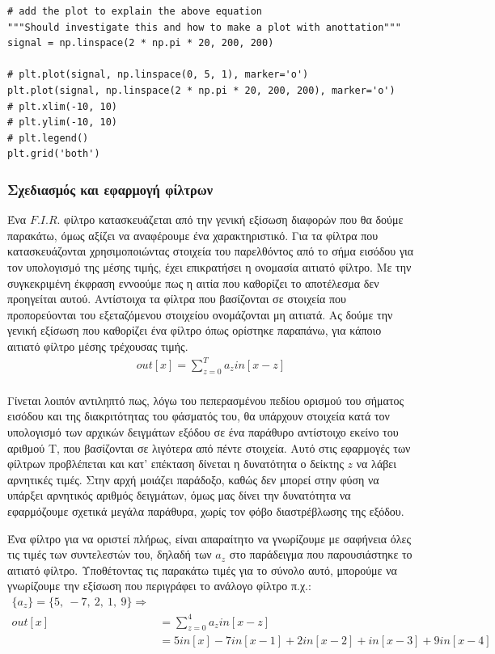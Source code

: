 \documentclass[breaklines=true, 12pt]{article}
\begin{document}
\begin{verbatim}
# add the plot to explain the above equation
"""Should investigate this and how to make a plot with anottation"""
signal = np.linspace(2 * np.pi * 20, 200, 200)

# plt.plot(signal, np.linspace(0, 5, 1), marker='o')
plt.plot(signal, np.linspace(2 * np.pi * 20, 200, 200), marker='o')
# plt.xlim(-10, 10)
# plt.ylim(-10, 10)
# plt.legend()
plt.grid('both')
\end{verbatim}
\subsubsection{Σχεδιασμός και εφαρμογή φίλτρων}
\label{sec:org9ff996f}
Ένα \(F.I.R.\) φίλτρο κατασκευάζεται από την γενική εξίσωση διαφορών που θα δούμε παρακάτω,
όμως αξίζει να αναφέρουμε ένα χαρακτηριστικό. Για τα φίλτρα που κατασκευάζονται
χρησιμοποιώντας στοιχεία του παρελθόντος από το σήμα εισόδου για τον υπολογισμό της μέσης τιμής,
έχει επικρατήσει η ονομασία αιτιατό φίλτρο. Με την συγκεκριμένη έκφραση εννοούμε πως
η αιτία που καθορίζει το αποτέλεσμα δεν προηγείται αυτού. Αντίστοιχα τα φίλτρα που
βασίζονται σε στοιχεία που προπορεύονται του εξεταζόμενου στοιχείου ονομάζονται μη
αιτιατά. Ας δούμε την γενική εξίσωση που καθορίζει ένα φίλτρο όπως ορίστηκε παραπάνω,
για κάποιο αιτιατό φίλτρο μέσης τρέχουσας τιμής.
\begin{equation}
\begin{align}
out[x] = \sum_{z=0}^{{T}} a_{z} in[x-z] \\
\end{align}
\end{equation}

Γίνεται λοιπόν αντιληπτό πως, λόγω του πεπερασμένου πεδίου ορισμού του σήματος εισόδου
και της διακριτότητας του φάσματός του, θα υπάρχουν στοιχεία κατά τον υπολογισμό των
αρχικών δειγμάτων εξόδου σε ένα παράθυρο αντίστοιχο εκείνο του αριθμού Τ, που βασίζονται
σε λιγότερα από πέντε στοιχεία. Αυτό στις εφαρμογές των φίλτρων προβλέπεται και κατ'
επέκταση δίνεται η δυνατότητα ο δείκτης \(z\) να λάβει αρνητικές τιμές. Στην αρχή μοιάζει
παράδοξο, καθώς δεν μπορεί στην φύση να υπάρξει αρνητικός αριθμός δειγμάτων, όμως μας
δίνει την δυνατότητα να εφαρμόζουμε σχετικά μεγάλα παράθυρα, χωρίς τον φόβο διαστρέβλωσης
της εξόδου.

Ένα φίλτρο για να οριστεί πλήρως, είναι απαραίτητο να γνωρίζουμε με σαφήνεια όλες τις
τιμές των συντελεστών του, δηλαδή των \(a_{z}\) στο παράδειγμα που παρουσιάστηκε το αιτιατό φίλτρο.
Υποθέτοντας τις παρακάτω τιμές για το σύνολο αυτό, μπορούμε να γνωρίζουμε την εξίσωση
που περιγράφει το ανάλογο φίλτρο π.χ.:
\begin{equation}
\begin{align}
\{a_{z}\} = \{5,\ -7,\ 2,\ 1,\ 9\} \Rightarrow \\
out[x] &= \sum_{z=0}^{4}a_{z}in[x-z] \\
&= 5in[x] - 7in[x-1] + 2in[x-2] + in[x-3] +9in[x-4]
\end{align}
\end{equation}
\end{document}
